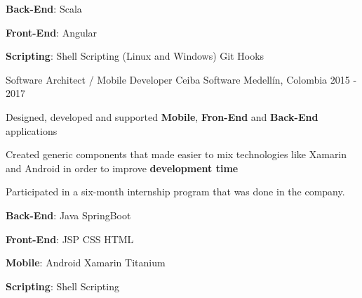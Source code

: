 \begin{cventries}
{\begin{cvitems}
        \item {\textbf{Back-End}: Scala {\dotsep} }
        \item {\textbf{Front-End}: Angular {\dotsep} }
        \item {\textbf{Scripting}: Shell Scripting (Linux and Windows){\dotsep}  {\dotsep} Git Hooks  {\dotsep} }
      \end{cvitems}
      \begin{cvsubentries}
      \end{cvsubentries}
    }
  \cventry
    {Software Architect / Mobile Developer}
    {Ceiba Software}
    {Medellín, Colombia}
    {2015 - 2017}
    {
      \begin{cvitems}
        \item {Designed, developed and supported \textbf{Mobile}, \textbf{Fron-End} and \textbf{Back-End} applications}
        \item {Created generic components that made easier to mix technologies like Xamarin and Android in order to improve \textbf{development time}}
        \item {Participated in a six-month internship program that was done in the company.}
        \item {\textbf{Back-End}: Java {\dotsep}  {\dotsep} SpringBoot {\dotsep} }
        \item {\textbf{Front-End}: JSP {\dotsep} CSS {\dotsep}  {\dotsep} HTML {\dotsep} }
        \item {\textbf{Mobile}: Android {\dotsep}  {\dotsep} Xamarin {\dotsep} Titanium}
        \item {\textbf{Scripting}: Shell Scripting {\dotsep} }
      \end{cvitems}
      \begin{cvsubentries}
                      {}{}

\end{cvsubentries}}
\end{cventries}
